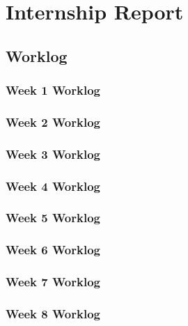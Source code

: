 \providecommand{\tightlist}{%
  \setlength{\itemsep}{0pt}\setlength{\parskip}{0pt}%
}

\section{Internship Report}

\subsection{Worklog}

\subsubsection{Week 1 Worklog}


\subsubsection{Week 2 Worklog}


\subsubsection{Week 3 Worklog}


\subsubsection{Week 4 Worklog}


\subsubsection{Week 5 Worklog}


\subsubsection{Week 6 Worklog}


\subsubsection{Week 7 Worklog}


\subsubsection{Week 8 Worklog}


